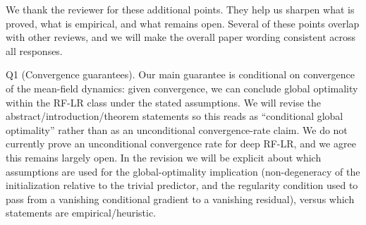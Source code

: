 We thank the reviewer for these additional points. They help us sharpen what is proved, what is empirical, and what remains open.
Several of these points overlap with other reviews, and we will make the overall paper wording consistent across all responses.

Q1 (Convergence guarantees). Our main guarantee is conditional on convergence of the mean-field dynamics: given convergence, we can conclude global optimality within the RF-LR class under the stated assumptions. We will revise the abstract/introduction/theorem statements so this reads as “conditional global optimality” rather than as an unconditional convergence-rate claim.
We do not currently prove an unconditional convergence rate for deep RF-LR, and we agree this remains largely open. In the revision we will be explicit about which assumptions are used for the global-optimality implication (non-degeneracy of the initialization relative to the trivial predictor, and the regularity condition used to pass from a vanishing conditional gradient to a vanishing residual), versus which statements are empirical/heuristic.

